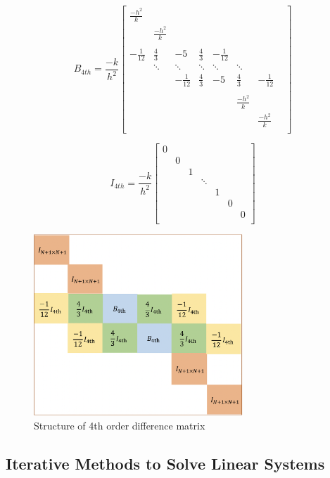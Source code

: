 \documentclass[a4paper]{article}
\begin{document}
\[
B_{4th}
= \frac{-k}{h^2}
\begin{bmatrix}
     \frac{-h^2}{k} \\
    & \frac{-h^2}{k}\\\\
    -\frac{1}{12}  & \frac{4}{3}  & -5 & \frac{4}{3}  & - \frac{1}{12} & &&\\
    
     & \ddots& \ddots & \ddots & \ddots & \ddots & \\
    
    && -\frac{1}{12}  & \frac{4}{3}  & -5 & \frac{4}{3}  & - \frac{1}{12} \\\\
    &&&&& \frac{-h^2}{k} \\
    &&&&&& \frac{-h^2}{k} \\
\end{bmatrix}
\]

\[
I_{4th}
=  \frac{-k}{h^2}
\begin{bmatrix}
    0\\
    & 0\\
    &&1\\
    &&&\ddots \\
    &&&&1\\
    &&&&&0\\
    &&&&&&0\\
\end{bmatrix}
\]


\begin{figure}[htbp]
\centering
\includegraphics[width=0.7\textwidth]{4th.png}
\caption{\label{4th}Structure of 4th order difference matrix}
\end{figure}

\subsection{Iterative Methods to Solve Linear Systems}
\end{document}
